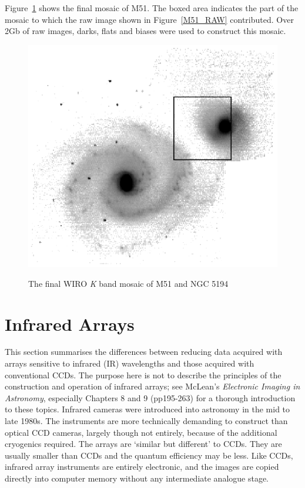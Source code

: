 \documentclass[twoside,11pt]{article}
\newcommand{\xlabel}[1]{}
\begin{document}
Figure~\ref{M51_MOSAIC} shows the final mosaic of M51.  The boxed
area indicates the part of the mosaic to which the raw image shown
in Figure~\ref{M51_RAW} contributed.  Over 2Gb of raw images, darks,
flats and biases were used to construct this mosaic.

\begin{figure}[htbp]
   \centering
   \includegraphics[totalheight=4in]{sc5_m51_mosaic.ps}
   \begin{quote}
   \caption{The final WIRO {\it K}\/ band mosaic of M51 and NGC 5194
   \label{M51_MOSAIC} }
   \end{quote}
\end{figure}


\section{\xlabel{IR}\label{IR}Infrared Arrays}

This section summarises the differences between reducing data acquired
with arrays sensitive to infrared (IR) wavelengths and those acquired
with conventional CCDs.  The purpose here is not to describe the principles
of the construction and operation of infrared arrays; see McLean's {\it
Electronic Imaging in Astronomy}\/\cite{MCLEAN97}, especially Chapters 8
and 9 (pp195-263) for a thorough introduction to these topics.  Infrared
cameras were introduced into astronomy in the mid to late 1980s.  The
instruments are more technically demanding to construct than optical
CCD cameras, largely though not entirely, because of the additional
cryogenics required.  The arrays are `similar but different' to CCDs.
They are usually smaller than CCDs and the quantum efficiency may be less.
Like CCDs, infrared array instruments are entirely electronic, and the
images are copied directly into computer memory without any intermediate
analogue stage.
\end{document}
